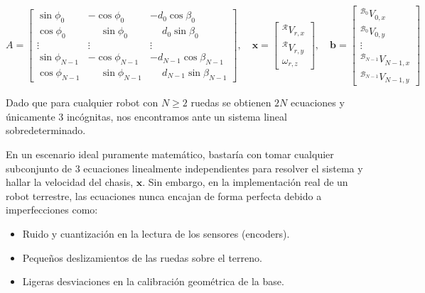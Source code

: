 \documentclass[11pt,a4paper]{article}
\newcommand{\frameR}{\mathcal{R}}
\newcommand{\frameBZero}{\mathcal{B}_0}
\newcommand{\frameBNMinusOne}{\mathcal{B}_{N-1}}
\begin{document}
\[
    A = \begin{bmatrix}
        \sin\phi_0     & -\cos\phi_0               & -d_0\cos\beta_0                   \\
        \cos\phi_0     & \phantom{-}\sin\phi_0     & \phantom{-}d_0\sin\beta_0         \\
        \vdots         & \vdots                    & \vdots                            \\
        \sin\phi_{N-1} & -\cos\phi_{N-1}           & -d_{N-1}\cos\beta_{N-1}           \\
        \cos\phi_{N-1} & \phantom{-}\sin\phi_{N-1} & \phantom{-}d_{N-1}\sin\beta_{N-1}
    \end{bmatrix}, \quad \mathbf{x} =
    \begin{bmatrix}
        {}^\frameR V_{r,x} \\
        {}^\frameR V_{r,y} \\
        \omega_{r,z}
    \end{bmatrix}, \quad \mathbf{b} = \begin{bmatrix}
        {}^{\frameBZero}V_{0,x}        \\
        {}^{\frameBZero}V_{0,y}        \\
        \vdots                         \\
        {}^{\frameBNMinusOne}V_{N-1,x} \\
        {}^{\frameBNMinusOne}V_{N-1,y}
    \end{bmatrix}
\]

Dado que para cualquier robot con \(N \ge 2\) ruedas se obtienen \(2N\) ecuaciones y únicamente 3 incógnitas, nos encontramos ante un sistema lineal sobredeterminado.

En un escenario ideal puramente matemático, bastaría con tomar cualquier subconjunto de 3 ecuaciones linealmente independientes para resolver el sistema y hallar la velocidad del chasis, \(\mathbf{x}\). Sin embargo, en la implementación real de un robot terrestre, las ecuaciones nunca encajan de forma perfecta debido a imperfecciones como:

\begin{itemize}
    \item Ruido y cuantización en la lectura de los sensores (encoders).
    \item Pequeños deslizamientos de las ruedas sobre el terreno.
    \item Ligeras desviaciones en la calibración geométrica de la base.
\end{itemize}
\end{document}

